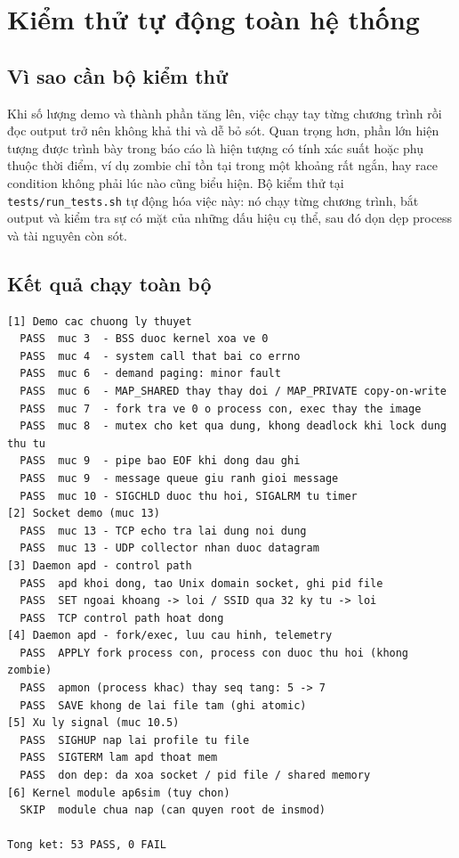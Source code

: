\documentclass[11pt]{article}
\newcommand{\code}[1]{\texttt{#1}}
\begin{document}
\section{Kiểm thử tự động toàn hệ thống}

\subsection{Vì sao cần bộ kiểm thử}

Khi số lượng demo và thành phần tăng lên, việc chạy tay từng chương trình rồi đọc output trở nên không khả thi và dễ bỏ sót. Quan trọng hơn, phần lớn hiện tượng được trình bày trong báo cáo là hiện tượng có tính xác suất hoặc phụ thuộc thời điểm, ví dụ zombie chỉ tồn tại trong một khoảng rất ngắn, hay race condition không phải lúc nào cũng biểu hiện. Bộ kiểm thử tại \code{tests/run\_tests.sh} tự động hóa việc này: nó chạy từng chương trình, bắt output và kiểm tra sự có mặt của những dấu hiệu cụ thể, sau đó dọn dẹp process và tài nguyên còn sót.

\subsection{Kết quả chạy toàn bộ}

\begin{lstlisting}[caption={Trích kết quả \code{make test} (53 test case)}]
[1] Demo cac chuong ly thuyet
  PASS  muc 3  - BSS duoc kernel xoa ve 0
  PASS  muc 4  - system call that bai co errno
  PASS  muc 6  - demand paging: minor fault
  PASS  muc 6  - MAP_SHARED thay thay doi / MAP_PRIVATE copy-on-write
  PASS  muc 7  - fork tra ve 0 o process con, exec thay the image
  PASS  muc 8  - mutex cho ket qua dung, khong deadlock khi lock dung thu tu
  PASS  muc 9  - pipe bao EOF khi dong dau ghi
  PASS  muc 9  - message queue giu ranh gioi message
  PASS  muc 10 - SIGCHLD duoc thu hoi, SIGALRM tu timer
[2] Socket demo (muc 13)
  PASS  muc 13 - TCP echo tra lai dung noi dung
  PASS  muc 13 - UDP collector nhan duoc datagram
[3] Daemon apd - control path
  PASS  apd khoi dong, tao Unix domain socket, ghi pid file
  PASS  SET ngoai khoang -> loi / SSID qua 32 ky tu -> loi
  PASS  TCP control path hoat dong
[4] Daemon apd - fork/exec, luu cau hinh, telemetry
  PASS  APPLY fork process con, process con duoc thu hoi (khong zombie)
  PASS  apmon (process khac) thay seq tang: 5 -> 7
  PASS  SAVE khong de lai file tam (ghi atomic)
[5] Xu ly signal (muc 10.5)
  PASS  SIGHUP nap lai profile tu file
  PASS  SIGTERM lam apd thoat mem
  PASS  don dep: da xoa socket / pid file / shared memory
[6] Kernel module ap6sim (tuy chon)
  SKIP  module chua nap (can quyen root de insmod)

Tong ket: 53 PASS, 0 FAIL
\end{lstlisting}
\end{document}
